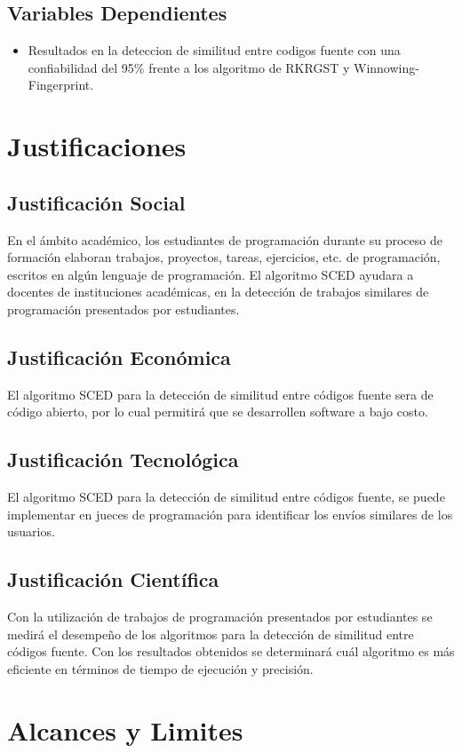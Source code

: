 \subsection{Variables Dependientes}
\begin{itemize}
    \item Resultados en la deteccion de similitud entre codigos fuente con una confiabilidad del 95\% frente a los algoritmo de RKRGST y Winnowing-Fingerprint.
\end{itemize}
\section{Justificaciones}
\subsection{Justificación Social}
En el ámbito académico, los estudiantes de programación durante su proceso de formación elaboran trabajos, proyectos, tareas, ejercicios, etc. de programación, escritos en algún lenguaje de programación. El algoritmo SCED ayudara a docentes de instituciones académicas, en la detección de trabajos similares de programación presentados por estudiantes.
\subsection{Justificación Económica}
El algoritmo SCED para la detección de similitud entre códigos fuente sera de código abierto, por lo cual permitirá que se desarrollen software a bajo costo.
\subsection{Justificación Tecnológica}
El algoritmo SCED para la detección de similitud entre códigos fuente, se puede implementar en jueces de programación para identificar los envíos similares de los usuarios.
\subsection{Justificación Científica}
Con la utilización de trabajos de programación presentados por estudiantes se medirá el desempeño de los algoritmos para la detección de similitud entre códigos fuente. Con los resultados obtenidos se determinará cuál algoritmo es más eficiente en términos de tiempo de ejecución y precisión.
\section{Alcances y Limites}
